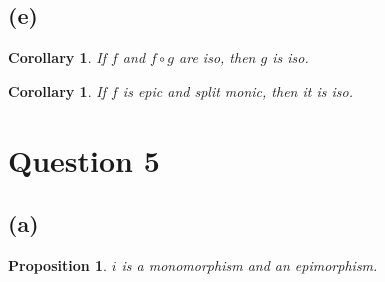 \documentclass[11pt]{article} %
\newtheorem{corollary}[theorem]{Corollary}
\newtheorem{proposition}[theorem]{Proposition}
\theoremstyle{definition}
\begin{document}
\subsection*{(e)}
\begin{corollary}
    If $f$ and $f\circ g$ are iso, then $g$ is iso.
\end{corollary}
\begin{corollary}
    If $f$ is epic and split monic, then it is iso.
\end{corollary}

\section*{Question 5}
\addtocounter{section}{1}
\subsection*{(a)}
\begin{proposition}
    $i$ is a monomorphism and an epimorphism.
\end{proposition}
\end{document}
